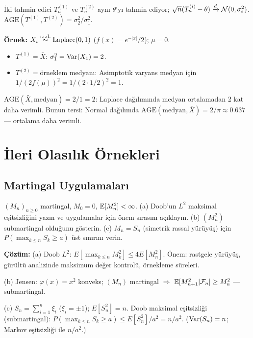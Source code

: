 \begin{ornek}
İki tahmin edici $T_n^{(1)}$ ve $T_n^{(2)}$ aynı $\theta$'yı tahmin ediyor; $\sqrt{n}(T_n^{(i)}-\theta)\xrightarrow{d}\mathcal{N}(0,\sigma_i^2)$.
$\mathrm{AGE}(T^{(1)},T^{(2)})=\sigma_2^2/\sigma_1^2$.

\textbf{Örnek:} $X_i\overset{\text{i.i.d.}}{\sim}\mathrm{Laplace}(0,1)$ ($f(x)=e^{-|x|}/2$); $\mu=0$.
\begin{itemize}
  \item $T^{(1)}=\bar X$: $\sigma^2_1=\operatorname{Var}(X_1)=2$.
  \item $T^{(2)}=\text{örneklem medyanı}$: Asimptotik varyans medyan için $1/(2f(\mu))^2=1/(2\cdot1/2)^2=1$.
\end{itemize}
$\mathrm{AGE}(\bar X,\text{medyan})=2/1=2$: Laplace dağılımında medyan ortalamadan 2 kat daha verimli.
Bunun tersi: Normal dağılımda $\mathrm{AGE}(\text{medyan},\bar X)=2/\pi\approx0.637$ --- ortalama daha verimli.
\end{ornek}

\section{İleri Olasılık Örnekleri}
\label{app:ileri_olasilik}

\subsection{Martingal Uygulamaları}

\begin{ornek}
$(M_n)_{n\geq0}$ martingal, $M_0=0$, $\mathbb{E}[M_n^2]<\infty$.
(a) Doob'un $L^2$ maksimal eşitsizliğini yazın ve uygulamalar için önem sırasını açıklayın.
(b) $(M_n^2)$ submartingal olduğunu gösterin.
(c) $M_n=S_n$ (simetrik rassal yürüyüş) için $P(\max_{k\leq n}S_k\geq a)$ üst sınırını verin.

\textbf{Çözüm:}
(a) Doob $L^2$: $E[\max_{k\leq n}M_k^2]\leq 4E[M_n^2]$. Önem: rastgele yürüyüş, gürültü analizinde maksimum değer kontrolü, örnekleme süreleri.

(b) Jensen: $\varphi(x)=x^2$ konveks; $(M_n)$ martingal $\Rightarrow$ $\mathbb{E}[M_{n+1}^2|\mathcal{F}_n]\geq M_n^2$ --- submartingal.

(c) $S_n=\sum_{i=1}^n\xi_i$ ($\xi_i=\pm1$); $E[S_n^2]=n$.
Doob maksimal eşitsizliği (submartingal): $P(\max_{k\leq n}S_k\geq a)\leq E[S_n^2]/a^2=n/a^2$.
($\operatorname{Var}(S_n)=n$; Markov eşitsizliği ile $n/a^2$.)
\end{ornek}

